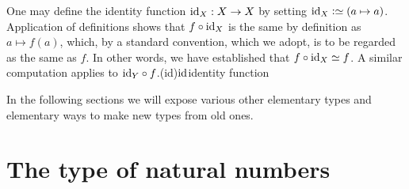 One may define the identity function $\mathord{\mathrm{id}}_X : X \to X$ by setting $\id_X \defeq (a \mapsto a)$.  Application of definitions shows that $f \circ
\mathord{\mathrm{id}}_X$ is the same by definition as $a \mapsto f(a)$, which, by a standard convention, which we adopt, is to be regarded as the same as $f$.  In
other words, we have established that $f \circ \id_X \jdeq f$.  A similar computation applies to $\mathord{\mathrm{id}}_Y \circ f$.\glossary(id){$\mathord{\mathrm{id}}$}{identity function}

In the following sections we will expose various other elementary types and elementary ways to make new types from old ones.

\section{The type of natural numbers}
\label{sec:natural-numbers}


